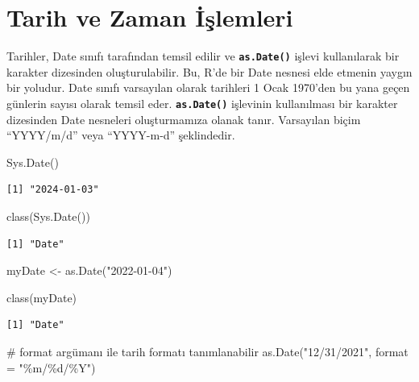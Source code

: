 \documentclass[
  letterpaper,
  DIV=11,
  numbers=noendperiod]{scrreprt}
\newenvironment{Shaded}{\begin{snugshade}}{\end{snugshade}}
\newcommand{\AttributeTok}[1]{\textcolor[rgb]{0.40,0.45,0.13}{#1}}
\newcommand{\CommentTok}[1]{\textcolor[rgb]{0.37,0.37,0.37}{#1}}
\newcommand{\FunctionTok}[1]{\textcolor[rgb]{0.28,0.35,0.67}{#1}}
\newcommand{\NormalTok}[1]{\textcolor[rgb]{0.00,0.23,0.31}{#1}}
\newcommand{\OtherTok}[1]{\textcolor[rgb]{0.00,0.23,0.31}{#1}}
\newcommand{\StringTok}[1]{\textcolor[rgb]{0.13,0.47,0.30}{#1}}
\begin{document}
\hypertarget{tarih-ve-zaman-iux15flemleri}{%
\chapter{Tarih ve Zaman İşlemleri}\label{tarih-ve-zaman-iux15flemleri}}

Tarihler, Date sınıfı tarafından temsil edilir ve
\textbf{\texttt{as.Date()}} işlevi kullanılarak bir karakter dizesinden
oluşturulabilir. Bu, R'de bir Date nesnesi elde etmenin yaygın bir
yoludur. Date sınıfı varsayılan olarak tarihleri 1 Ocak 1970'den bu yana
geçen günlerin sayısı olarak temsil eder. \textbf{\texttt{as.Date()}}
işlevinin kullanılması bir karakter dizesinden Date nesneleri
oluşturmamıza olanak tanır. Varsayılan biçim ``YYYY/m/d'' veya
``YYYY-m-d'' şeklindedir.

\begin{Shaded}
\begin{Highlighting}[]
\FunctionTok{Sys.Date}\NormalTok{()}
\end{Highlighting}
\end{Shaded}

\begin{verbatim}
[1] "2024-01-03"
\end{verbatim}

\begin{Shaded}
\begin{Highlighting}[]
\FunctionTok{class}\NormalTok{(}\FunctionTok{Sys.Date}\NormalTok{())}
\end{Highlighting}
\end{Shaded}

\begin{verbatim}
[1] "Date"
\end{verbatim}

\begin{Shaded}
\begin{Highlighting}[]
\NormalTok{myDate }\OtherTok{\textless{}{-}} \FunctionTok{as.Date}\NormalTok{(}\StringTok{"2022{-}01{-}04"}\NormalTok{)}

\FunctionTok{class}\NormalTok{(myDate)}
\end{Highlighting}
\end{Shaded}

\begin{verbatim}
[1] "Date"
\end{verbatim}

\begin{Shaded}
\begin{Highlighting}[]
\CommentTok{\# format argümanı ile tarih formatı tanımlanabilir}
\FunctionTok{as.Date}\NormalTok{(}\StringTok{"12/31/2021"}\NormalTok{, }\AttributeTok{format =} \StringTok{"\%m/\%d/\%Y"}\NormalTok{)}
\end{Highlighting}
\end{Shaded}
\end{document}
